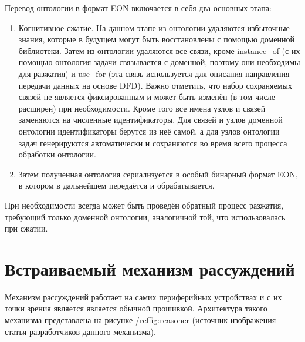 Перевод онтологии в формат EON включается в себя два основных этапа:
\begin{enumerate}
	\item Когнитивное сжатие. 
	На данном этапе из онтологии удаляются избыточные знания, которые в будущем могут быть восстановлены с помощью доменной библиотеки.
	Затем из онтологии удаляются все связи, кроме instance_of (с их помощью онтология задачи связывается с доменной, поэтому они необходимы для разжатия) и use_for (эта связь используется для описания направления передачи данных на основе DFD).
	Важно отметить, что набор сохраняемых связей не является фиксированным и может быть изменён (в том числе расширен) при необходимости.
	Кроме того все имена узлов и связей заменяются на численные идентификаторы.
	Для связей и узлов доменной онтологии идентификаторы берутся из неё самой, а для узлов онтологии задач генерируются автоматически и сохраняются во время всего процесса обработки онтологии.
	\item Затем полученная онтология сериализуется в особый бинарный формат EON, в котором в дальнейшем передаётся и обрабатывается.
\end{enumerate}

При необходимости всегда может быть проведён обратный процесс разжатия, требующий только доменной онтологии, аналогичной той, что использовалась при сжатии.

\section{Встраиваемый механизм рассуждений}

Механизм рассуждений работает на самих периферийных устройствах и с их точки зрения является является обычной прошивкой.
Архитектура такого механизма представлена на рисунке /ref{fig:reasoner} (источник изображения~--- статья разработчиков данного механизма\cite{article:ODEC}).



